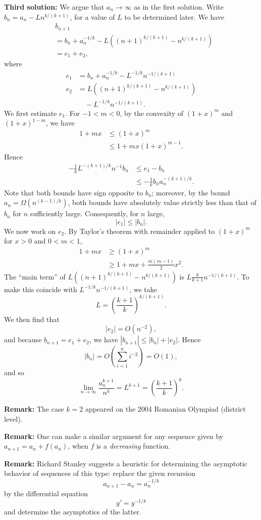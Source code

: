 \documentclass[amssymb,twocolumn,pra,10pt,aps]{revtex4-1}
\begin{document}
\begin{itemize}
\textbf{Third solution:}
We argue that $a_n \to \infty$ as in the first solution.
Write $b_n = a_n - L n^{k/(k+1)}$, for a value of $L$ to be determined
later.
We have
\begin{align*}
&b_{n+1} \\
 &= b_n + a_n^{-1/k} - L ((n+1)^{k/(k+1)} - n^{k/(k+1)}) \\
&= e_1 + e_2,
\end{align*}
where
\begin{align*}
e_1 &= b_n + a_n^{-1/k} - L^{-1/k} n^{-1/(k+1)} \\
e_2 &= L ((n+1)^{k/(k+1)} - n^{k/(k+1)}) \\
&\quad - L^{-1/k} n^{-1/(k+1)}.
\end{align*}
We first estimate $e_1$.
For $-1 < m < 0$, by the convexity of $(1+x)^m$
and $(1+x)^{1-m}$, we have
\begin{align*}
1 + mx &\leq (1+x)^m \\
&\leq 1 + mx (1+x)^{m-1}.
\end{align*}
Hence
\begin{align*}
-\frac{1}{k} L^{-(k+1)/k} n^{-1} b_n &\leq e_1 - b_n \\
&\leq
-\frac{1}{k} b_n a_n^{-(k+1)/k}.
\end{align*}
Note that both bounds have sign opposite to $b_n$; moreover,
by the bound $a_n = \Omega(n^{(k-1)/k})$, both bounds have absolutely
value strictly less than that of $b_n$ for $n$ sufficiently large. Consequently,
for $n$ large,
\[
|e_1| \leq |b_n|.
\]
We now work on $e_2$.
By Taylor's theorem
with remainder applied to $(1+x)^m$ for $x > 0$ and $0 < m < 1$,
\begin{align*}
1+mx &\geq (1+x)^m \\
&\geq 1 + mx + \frac{m(m-1)}{2} x^2.
\end{align*}
The ``main term'' of $L ((n+1)^{k/(k+1)} - n^{k/(k+1)})$
is $L \frac{k}{k+1} n^{-1/(k+1)}$. To make this coincide with
$L^{-1/k} n^{-1/(k+1)}$, we take
\[
L = \left( \frac{k+1}{k} \right)^{k/(k+1)}.
\]
We then find that
\[
|e_2| = O(n^{-2}),
\]
and because $b_{n+1} = e_1 + e_2$, we have
$|b_{n+1}| \leq |b_n| + |e_2|$. Hence
\[
|b_n| = O\left (\sum_{i=1}^n i^{-2} \right) = O(1),
\]
and so
\[
\lim_{n \to \infty} \frac{a_n^{k+1}}{n^k} = L^{k+1} = \left( \frac{k+1}{k} \right)^k.
\]

\textbf{Remark:}
The case $k=2$ appeared on the 2004 Romanian Olympiad (district level).

\textbf{Remark:}
One can make a similar argument for any sequence given by
$a_{n+1} = a_n + f(a_n)$, when $f$ is a \emph{decreasing} function.

\textbf{Remark:}
Richard Stanley suggests a heuristic for determining the asymptotic
behavior of sequences of this type: replace the given recursion
\[
a_{n+1} - a_n = a_n^{-1/k}
\]
by the differential equation
\[
y' = y^{-1/k}
\]
and determine the asymptotics of the latter.
\end{itemize}
\end{document}
